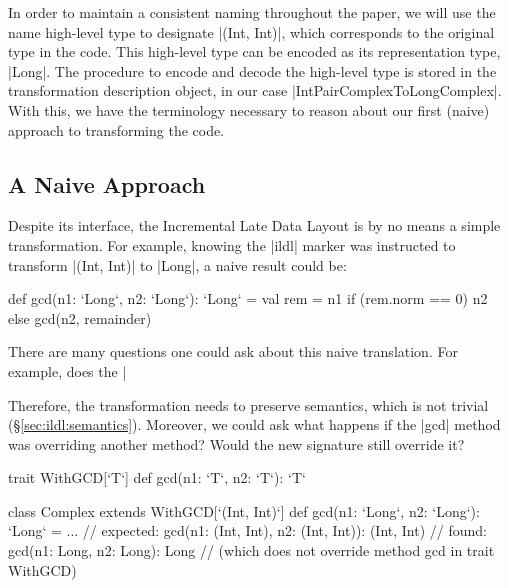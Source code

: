 In order to maintain a consistent naming throughout the paper, we will use the name high-level type to designate |(Int, Int)|, which corresponds to the original type in the code. This high-level type can be encoded as its representation type, |Long|. The procedure to encode and decode the high-level type is stored in the transformation description object, in our case |IntPairComplexToLongComplex|. With this, we have the terminology necessary to reason about our first (naive) approach to transforming the code.

\subsection{A Naive Approach}

Despite its interface, the Incremental Late Data Layout is by no means a simple transformation. For example, knowing the |ildl| marker was instructed to transform |(Int, Int)| to |Long|, a naive result could be:

\begin{lstlisting-nobreak}
def gcd(n1: `Long`, n2: `Long`): `Long` = {
  val rem = n1 %
  if (rem.norm == 0) n2 else gcd(n2, remainder)
}
\end{lstlisting-nobreak}

There are many questions one could ask about this naive translation. For example, does the |%

Therefore, the transformation needs to preserve semantics, which is not trivial (\S\ref{sec:ildl:semantics}). Moreover, we could ask what happens if the |gcd| method was overriding another method? Would the new signature still override it?


\begin{lstlisting-nobreak}
trait WithGCD[`T`] {
  def gcd(n1: `T`, n2: `T`): `T`
}

class Complex extends WithGCD[`(Int, Int)`] {
  def gcd(n1: `Long`, n2: `Long`): `Long` = ...
  // expected: gcd(n1: (Int, Int), n2: (Int, Int)): (Int, Int)
  // found:    gcd(n1: Long, n2: Long): Long
  // (which does not override method gcd in trait WithGCD)
}
\end{lstlisting-nobreak}
%

